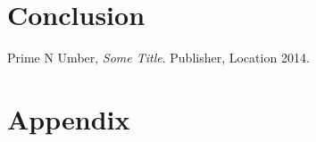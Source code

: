 \documentclass[11pt]{article}
\begin{document}
\clearpage
\section{Conclusion}
\label{sec:conclusion}

\clearpage
\begin{thebibliography}{9}

    Prime N Umber,
    \emph{Some Title}.
    Publisher, Location
    2014.

\end{thebibliography}

\clearpage
\appendix
\section{Appendix}
\label{sec:appendix}

\end{document}

